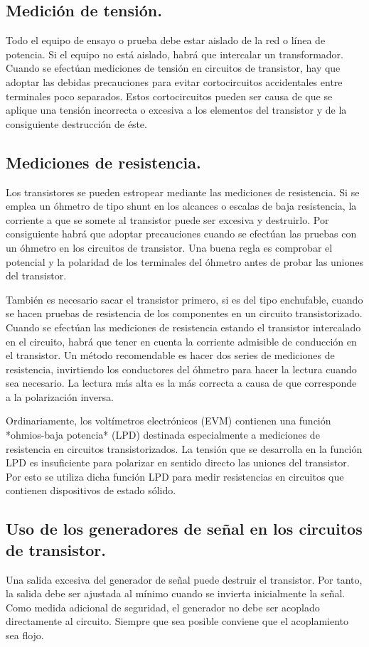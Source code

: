 \documentclass[a4paper,12pt]{article}
\begin{document}
\subsection{Medición de tensión.}
Todo el equipo de ensayo o prueba debe estar aislado de la red o línea
de potencia. Si el equipo no está aislado, habrá que intercalar un
transformador. Cuando se efectúan mediciones de tensión en circuitos de
transistor, hay que adoptar las debidas precauciones para evitar cortocircuitos
accidentales entre terminales poco separados. Estos cortocircuitos pueden ser causa
de que se aplique una tensión incorrecta o excesiva a los elementos del transistor
y de la consiguiente destrucción de éste.

\subsection{Mediciones de resistencia.}
Los transistores se pueden estropear mediante las mediciones de
resistencia. Si se emplea un óhmetro de tipo shunt en los alcances o
escalas de baja resistencia, la corriente a que se somete al transistor
puede ser excesiva y destruirlo. Por consiguiente habrá que adoptar
precauciones cuando se efectúan las pruebas con un óhmetro en los
circuitos de transistor. Una buena regla es comprobar el potencial y la
polaridad de los terminales del óhmetro antes de probar las uniones del
transistor.

También es necesario sacar el transistor primero, si es del tipo
enchufable, cuando se hacen pruebas de resistencia de los componentes
en un circuito transistorizado. Cuando se efectúan las mediciones de
resistencia estando el transistor intercalado en el circuito, habrá que
tener en cuenta la corriente admisible de conducción en el transistor. Un
método recomendable es hacer dos series de mediciones de resistencia,
invirtiendo los conductores del óhmetro para hacer la lectura cuando sea
necesario. La lectura más alta es la más correcta a causa de que
corresponde a la polarización inversa.

Ordinariamente, los voltímetros electrónicos (EVM) contienen una función
*ohmios-baja potencia* (LPD) destinada especialmente a mediciones de
resistencia en circuitos transistorizados. La tensión que se desarrolla en
la función LPD es insuficiente para polarizar en sentido directo las
uniones del transistor. Por esto se utiliza dicha función LPD para medir
resistencias en circuitos que contienen dispositivos de estado sólido.

\subsection{Uso de los generadores de señal en los circuitos de transistor.}
Una salida excesiva del generador de señal puede destruir el transistor.
Por tanto, la salida debe ser ajustada al mínimo cuando se invierta
inicialmente la señal. Como medida adicional de seguridad, el generador no
debe ser acoplado directamente al circuito. Siempre que sea posible
conviene que el acoplamiento sea flojo.
\end{document}
